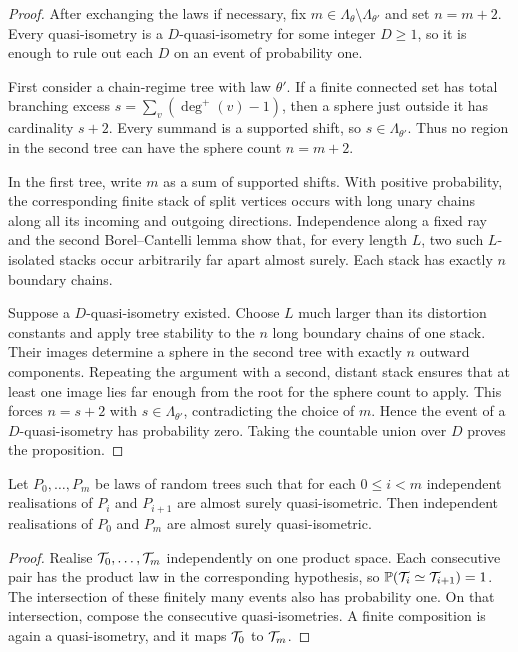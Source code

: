 \begin{proof}
\leanok
{}
After exchanging the laws if necessary, fix
$m\in\Lambda_\theta\setminus\Lambda_{\theta'}$ and set $n=m+2$. Every quasi-isometry is a
$D$-quasi-isometry for some integer $D\geq1$, so it is enough to rule out each $D$ on an event of
probability one.

First consider a chain-regime tree with law $\theta'$. If a finite connected set has total
branching excess $s=\sum_v(\deg^+(v)-1)$, then a sphere just outside it has cardinality $s+2$.
Every summand is a supported shift, so $s\in\Lambda_{\theta'}$. Thus no region in the second tree
can have the sphere count $n=m+2$.

In the first tree, write $m$ as a sum of supported shifts. With positive probability, the
corresponding finite stack of split vertices occurs with long unary chains along all its incoming
and outgoing directions. Independence along a fixed ray and the second Borel--Cantelli lemma show
that, for every length $L$, two such $L$-isolated stacks occur arbitrarily far apart almost surely.
Each stack has exactly $n$ boundary chains.

Suppose a $D$-quasi-isometry existed. Choose $L$ much larger than its distortion constants and
apply tree stability to the $n$ long boundary chains of one stack. Their images determine a sphere
in the second tree with exactly $n$ outward components. Repeating the argument with a second,
distant stack ensures that at least one image lies far enough from the root for the sphere count
to apply. This forces $n=s+2$ with $s\in\Lambda_{\theta'}$, contradicting the choice of $m$.
Hence the event of a $D$-quasi-isometry has probability zero. Taking the countable union over $D$
proves the proposition.
\end{proof}

\begin{lemma}
\label{thm:qi-transitive}
\leanok
{}
Let $P_0,\dots,P_m$ be laws of random trees such that for each $0\leq i<m$ independent
realisations of $P_i$ and $P_{i+1}$ are almost surely quasi-isometric. Then independent
realisations of $P_0$ and $P_m$ are almost surely quasi-isometric.
\end{lemma}

\begin{proof}
\leanok
Realise $\mathcal{T}_0,\dots,\mathcal{T}_m$ independently on one product space. Each consecutive pair has the
product law in the corresponding hypothesis, so
$\mathbb{P}(\mathcal{T}_i\simeq\mathcal{T}_{i+1})=1$. The intersection of these finitely many events also has
probability one. On that intersection, compose the consecutive quasi-isometries. A finite
composition is again a quasi-isometry, and it maps $\mathcal{T}_0$ to $\mathcal{T}_m$.
\end{proof}

